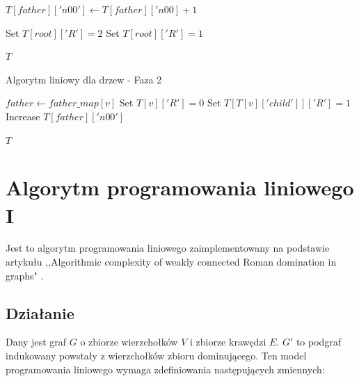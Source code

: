 \begin{algorithm}
\begin{algorithmic}[1]
                        \State $T[father]['n00'] \gets T[father]['n00] + 1$
                    \EndIf

                \EndIf
            \EndFor
    
                \State Set $T[root]['R'] = 2$
            \EndIf
                \State Set $T[root]['R'] = 1$
            \EndIf
    
            \State \Return $T$
        \EndFunction
    \end{algorithmic}
    \end{algorithm}
    
    \begin{algorithm}
    \caption*{Algorytm liniowy dla drzew - Faza 2}
    \begin{algorithmic}[1]
                \State $father \gets father\_map[v]$
                        \State Set $T[v]['R'] = 0$
                        \State Set $T[T[v]['child']]['R'] = 1$
                        \State Increase $T[father]['n00']$
                    \EndIf
                \EndIf
            \EndFor
    
            \State \Return $T$
        \EndFunction
    \end{algorithmic}
\end{algorithm}

\FloatBarrier
\section{Algorytm programowania liniowego I}
Jest to algorytm programowania liniowego zaimplementowany na podstawie artykułu ,,Algorithmic complexity of weakly connected Roman domination in graphs" \cite{ILP}.

\subsection{Działanie}

Dany jest graf $G$ o zbiorze wierzchołków $V$ i zbiorze krawędzi $E$. $G'$ to podgraf indukowany powstały z wierzchołków zbioru dominującego. Ten model programowania liniowego wymaga zdefiniowania następujących zmiennych:

